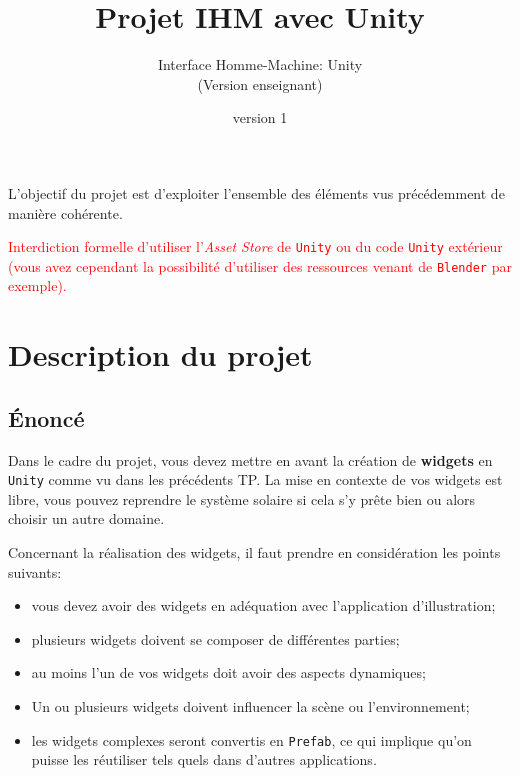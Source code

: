 \documentclass[a4paper,10pt]{article}
\begin{document}
	


\title{\vspace*{-1cm}Projet IHM avec Unity}
\author{\vspace*{-1.5cm}Interface Homme-Machine: Unity
\begin{ensnote}
	(Version enseignant)
\end{ensnote}
}
\date{\vspace*{-1.5cm}version 1}
\maketitle
\thispagestyle{fancy}

L'objectif du projet est d'exploiter l'ensemble des éléments vus précédemment de manière cohérente.

\textcolor{red}{Interdiction formelle d'utiliser l'\textit{Asset Store} de \texttt{Unity} ou du code \texttt{Unity} extérieur (vous avez cependant la possibilité d'utiliser des ressources venant de \texttt{Blender} par exemple).}


\section{Description du projet}

\subsection{Énoncé}
Dans le cadre du projet, vous devez mettre en avant la création de \textbf{widgets} en \texttt{Unity} comme vu dans les précédents TP. La mise en contexte de vos widgets est libre, vous pouvez reprendre le système solaire si cela s'y prête bien ou alors choisir un autre domaine.

Concernant la réalisation des widgets, il faut prendre en considération les points suivants:
\begin{itemize}
	\item vous devez avoir des widgets en adéquation avec l'application d'illustration;
	\item plusieurs widgets doivent se composer de différentes parties;
	\item au moins l'un de vos widgets doit avoir des aspects dynamiques;
	\item Un ou plusieurs widgets doivent influencer la scène ou l'environnement;
	\item les widgets complexes seront convertis en \texttt{Prefab}, ce qui implique qu'on puisse les réutiliser tels quels dans d'autres applications.
\end{itemize}
\end{document}
